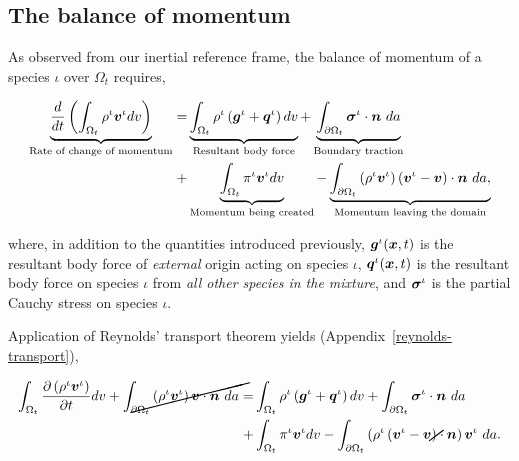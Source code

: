 

\subsection{The balance of momentum}
\label{eu-balance-of-momentum}

As observed from our inertial reference frame, the balance of
momentum of a species $\iota$ over $\Omega_{t}$ requires,

\begin{equation}
\begin{split}
\underbrace{\frac{d}{dt}\left(\int_{\Omega_{t}} \rho^{\iota}
  \mbox{\boldmath$ v$}^{\iota} dv \right)}_{\text{Rate of change of momentum}}  = 
& \underbrace{\int_{\Omega_{t}} \rho^{\iota} \left(\mbox{\boldmath$ g$}^{\iota} +
  \mbox{\boldmath$ q$}^{\iota}\right) dv}_{\text{Resultant body force}} 
+ \underbrace{\int_{\partial \Omega_{t}}
  \mbox{\boldmath$\sigma$}^{\iota}\cdot\mbox{\boldmath$ n$}\ da}_{\text{Boundary traction}}\\ 
+ & \underbrace{\int_{\Omega_{t}} \pi^{\iota}\mbox{\boldmath$ v$}^{\iota}
  dv}_{\text{Momentum being created}}
- \underbrace{\int_{\partial \Omega_{t}} \left(\rho^{\iota}
  \mbox{\boldmath$ v$}^{\iota} \right) \left(\mbox{\boldmath$ v$}^{\iota} -
\mbox{\boldmath$ v$}\right) \cdot \mbox{\boldmath$ n$}\ da,}_{\text{Momentum leaving the domain}} 
\end{split}
\label{globalbalanceofmomentum}
\end{equation}

where, in addition to the quantities introduced previously,
$\mbox{\boldmath$ g$}^{\iota}(\mbox{\boldmath$ x$},t)$ is the resultant body force of {\em external} origin
acting on species $\iota$, $\mbox{\boldmath$ q$}^{\iota}(\mbox{\boldmath$ x$},t)$ is the resultant body
force on species $\iota$ from {\em all other species in the mixture},
and $\mbox{\boldmath$\sigma$}^{\iota}$ is the partial Cauchy stress on species $\iota$.

Application of Reynolds' transport theorem yields
(Appendix~\ref{reynolds-transport}), 

\begin{equation*}
\begin{split}
\int_{\Omega_{t}} \frac{\partial \left(\rho^{\iota}\bv^{\iota}\right)}{\partial t} dv
+\cancel{\int_{\partial \Omega_{t}} \left(\rho^{\iota}\bv^{\iota}\right) \bv \cdot \bn\ da} =
& \int_{\Omega_{t}} \rho^{\iota} \left(\bg^{\iota}+\bq^{\iota}\right) dv 
+ \int_{\partial \Omega_{t}} \Bsigma^{\iota}\cdot\bn\ da\\
+ & \int_{\Omega_{t}} \pi^{\iota}\bv^{\iota} dv
- \int_{\partial \Omega_{t}} \left(\rho^{\iota} \left(\bv^{\iota} -
\cancel{\bv}\right) \cdot \bn \right) \bv^{\iota}\ da.
\end{split}
\end{equation*}

